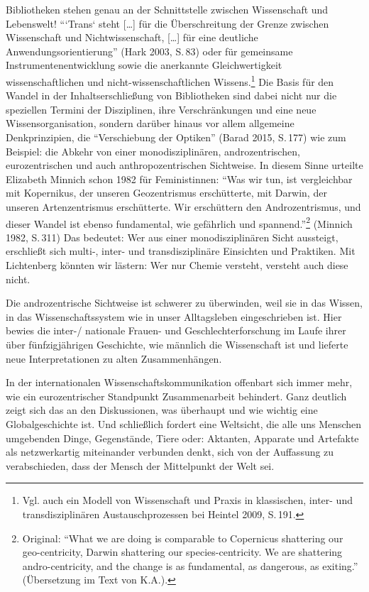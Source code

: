 Bibliotheken stehen genau an der Schnittstelle zwischen Wissenschaft und
Lebenswelt! \enquote{`Trans` steht {[}\ldots{}{]} für die Überschreitung
der Grenze zwischen Wissenschaft und Nichtwissenschaft, {[}\ldots{}{]}
für eine deutliche Anwendungsorientierung} (Hark 2003, S.\,83) oder für
gemeinsame Instrumentenentwicklung sowie die anerkannte Gleichwertigkeit
wissenschaftlichen und nicht-wissenschaftlichen Wissens.\footnote{Vgl.
  auch ein Modell von Wissenschaft und Praxis in klassischen, inter- und
  transdisziplinären Austauschprozessen bei Heintel 2009, S.\,191.} Die
Basis für den Wandel in der Inhaltserschließung von Bibliotheken sind
dabei nicht nur die speziellen Termini der Disziplinen, ihre
Verschränkungen und eine neue Wissensorganisation, sondern darüber
hinaus vor allem allgemeine Denkprinzipien, die \enquote{Verschiebung
der Optiken} (Barad 2015, S.\,177) wie zum Beispiel: die Abkehr von einer
monodisziplinären, androzentrischen, eurozentrischen und auch
anthropozentrischen Sichtweise. In diesem Sinne urteilte Elizabeth
Minnich schon 1982 für Feministinnen: \enquote{Was wir tun, ist
vergleichbar mit Kopernikus, der unseren Geozentrismus erschütterte, mit
Darwin, der unseren Artenzentrismus erschütterte. Wir erschüttern den
Androzentrismus, und dieser Wandel ist ebenso fundamental, wie
gefährlich und spannend.}\footnote{Original: \enquote{What we are doing
  is comparable to Copernicus shattering our geo-centricity, Darwin
  shattering our species-centricity. We are shattering andro-centricity,
  and the change is as fundamental, as dangerous, as exiting.}
  (Übersetzung im Text von K.A.).} (Minnich 1982, S.\,311) Das bedeutet:
Wer aus einer monodisziplinären Sicht aussteigt, erschließt sich multi-,
inter- und transdisziplinäre Einsichten und Praktiken. Mit Lichtenberg
könnten wir lästern: Wer nur Chemie versteht, versteht auch diese nicht.

Die androzentrische Sichtweise ist schwerer zu überwinden, weil sie in
das Wissen, in das Wissenschaftssystem wie in unser Alltagsleben
eingeschrieben ist. Hier bewies die inter-/ nationale Frauen- und
Geschlechterforschung im Laufe ihrer über fünfzigjährigen Geschichte,
wie männlich die Wissenschaft ist und lieferte neue Interpretationen zu
alten Zusammenhängen.

In der internationalen Wissenschaftskommunikation offenbart sich immer
mehr, wie ein eurozentrischer Standpunkt Zusammenarbeit behindert. Ganz
deutlich zeigt sich das an den Diskussionen, was überhaupt und wie
wichtig eine Globalgeschichte ist. Und schließlich fordert eine
Weltsicht, die alle uns Menschen umgebenden Dinge, Gegenstände, Tiere
oder: Aktanten, Apparate und Artefakte als netzwerkartig miteinander
verbunden denkt, sich von der Auffassung zu verabschieden, dass der
Mensch der Mittelpunkt der Welt sei.

